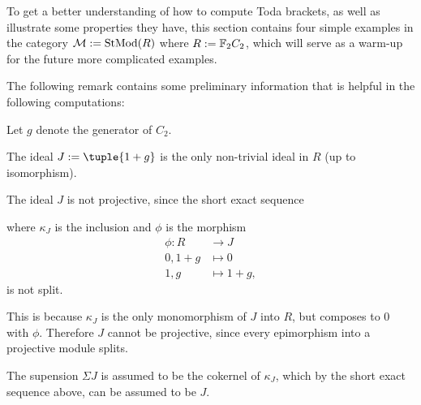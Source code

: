 To get a better understanding of how to compute Toda brackets, as well as illustrate some properties they have, this section contains four simple examples in the category \( {\mathcal{M}} := \operatorname{StMod}(R) \) where \( R := {\mathbb{F}}_2 C_2 \), which will serve as a warm-up for the future more complicated examples.

The following remark contains some preliminary information that is helpful in the following computations:

\begin{remark}
	\label{rem:toda_bracket_examples_properties}
    Let \( g \) denote the generator of \( C_2 \).

    The ideal \( J := \tuple{1 + g} \) is the only non-trivial ideal in \( R \) (up to isomorphism).

    The ideal \( J \) is not projective, since the short exact sequence
    \begin{center}
    \end{center}
    where \( \kappa_J \) is the inclusion and \( \phi \) is the morphism
    \begin{align*}
        \phi: R &\to J \\
        0, 1 + g &\mapsto 0 \\
        1, g &\mapsto 1 + g,
    \end{align*}
    is not split.

    This is because \( \kappa_J \) is the only monomorphism of \( J \) into \( R \), but composes to \( 0 \) with \( \phi \). Therefore \( J \) cannot be projective, since every epimorphism into a projective module splits.

    The supension \( \Sigma J \) is assumed to be the cokernel of \( \kappa_J \), which by the short exact sequence above, can be assumed to be \( J \).

\end{remark}

